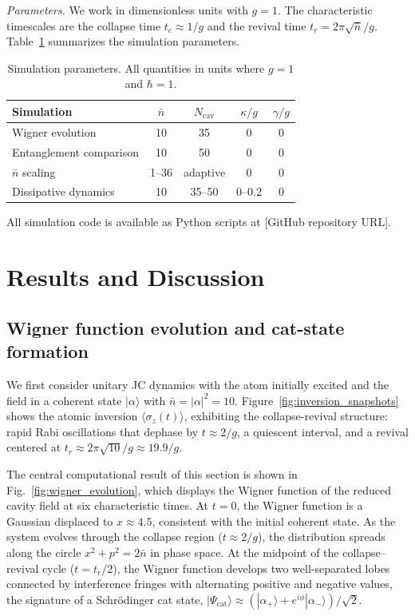 \documentclass[%
 reprint,
 amsmath,amssymb,
 aps,
]{revtex4-2}
\begin{document}
\textit{Parameters.} We work in dimensionless units with $g = 1$. The characteristic timescales are the collapse time $t_c \approx 1/g$ and the revival time $t_r = 2\pi\sqrt{\bar{n}}/g$. Table~\ref{tab:params} summarizes the simulation parameters.

\begin{table}[h]
\centering
\caption{Simulation parameters. All quantities in units where $g = 1$ and $\hbar = 1$.}
\label{tab:params}
\begin{tabular}{lcccc}
\hline\hline
Simulation & $\bar{n}$ & $N_{\text{cav}}$ & $\kappa/g$ & $\gamma/g$ \\
\hline
Wigner evolution & 10 & 35 & 0 & 0 \\
Entanglement comparison & 10 & 50 & 0 & 0 \\
$\bar{n}$ scaling & 1--36 & adaptive & 0 & 0 \\
Dissipative dynamics & 10 & 35--50 & 0--0.2 & 0 \\
\hline\hline
\end{tabular}
\end{table}

All simulation code is available as Python scripts at [GitHub repository URL].


\section{Results and Discussion}
\label{sec:results}

\subsection{Wigner function evolution and cat-state formation}
\label{sec:wigner_results}

We first consider unitary JC dynamics with the atom initially excited and the field in a coherent state $|\alpha\rangle$ with $\bar{n} = |\alpha|^2 = 10$. Figure~\ref{fig:inversion_snapshots} shows the atomic inversion $\langle\sigma_z(t)\rangle$, exhibiting the collapse-revival structure: rapid Rabi oscillations that dephase by $t \approx 2/g$, a quiescent interval, and a revival centered at $t_r \approx 2\pi\sqrt{10}/g \approx 19.9/g$.

The central computational result of this section is shown in Fig.~\ref{fig:wigner_evolution}, which displays the Wigner function of the reduced cavity field at six characteristic times. At $t = 0$, the Wigner function is a Gaussian displaced to $x \approx 4.5$, consistent with the initial coherent state. As the system evolves through the collapse region ($t \approx 2/g$), the distribution spreads along the circle $x^2 + p^2 = 2\bar{n}$ in phase space. At the midpoint of the collapse--revival cycle ($t = t_r/2$), the Wigner function develops two well-separated lobes connected by interference fringes with alternating positive and negative values, the signature of a Schr\"{o}dinger cat state, $|\Psi_{\text{cat}}\rangle \approx (|\alpha_+\rangle + e^{i\phi}|\alpha_-\rangle)/\sqrt{2}$.
\end{document}
